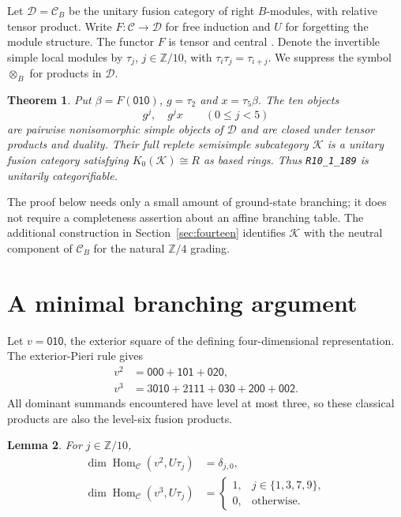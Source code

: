 \documentclass[11pt]{amsart}
\newtheorem{theorem}{Theorem}[section]
\newtheorem{lemma}[theorem]{Lemma}
\theoremstyle{remark}
\newcommand{\C}{\mathcal C}
\newcommand{\D}{\mathcal D}
\newcommand{\K}{\mathcal K}
\newcommand{\Hom}{\operatorname{Hom}}
\newcommand{\wt}[1]{\mathsf{#1}}
\begin{document}
Let $\D=\C_B$ be the unitary fusion category of right $B$-modules, with
relative tensor product. Write $F:\C\to\D$ for free induction and $U$ for
forgetting the module structure. The functor $F$ is tensor and central
\cite[\S\S3.3--3.4, equation~(17)]{DMNO}. Denote the invertible simple
local modules by $\tau_j$, $j\in\mathbb Z/10$, with
$\tau_i\tau_j=\tau_{i+j}$. We suppress the symbol $\otimes_B$ for
products in $\D$.

\begin{theorem}\label{thm:model}
Put $\beta=F(\wt{010})$, $g=\tau_2$ and $x=\tau_5\beta$. The ten objects
\[
  g^j,\quad g^jx\qquad (0\leq j<5)
\]
are pairwise nonisomorphic simple objects of $\D$ and are closed under
tensor products and duality. Their full replete semisimple subcategory
$\K$ is a unitary fusion category satisfying $K_0(\K)\cong R$ as based
rings. Thus \texttt{R10\_1\_189} is unitarily categorifiable.
\end{theorem}

The proof below needs only a small amount of ground-state branching; it
does not require a completeness assertion about an affine branching
table. The additional construction in Section~\ref{sec:fourteen}
identifies $\K$ with the neutral component of $\C_B$ for the natural
$\mathbb Z/4$ grading.

\section{A minimal branching argument}

Let $v=\wt{010}$, the exterior square of the defining four-dimensional
representation. The exterior-Pieri rule gives
\begin{align}
 v^2&=\wt{000}+\wt{101}+\wt{020},\label{eq:v2}\\
 v^3&=3\wt{010}+2\wt{111}+\wt{030}+\wt{200}+\wt{002}.
 \label{eq:v3}
\end{align}
All dominant summands encountered have level at most three, so these
classical products are also the level-six fusion products.

\begin{lemma}\label{lem:branch}
For $j\in\mathbb Z/10$,
\begin{align}
 \dim\Hom_{\C}(v^2,U\tau_j)&=\delta_{j,0},\label{eq:hom2}\\
 \dim\Hom_{\C}(v^3,U\tau_j)&=
 \begin{cases}1,&j\in\{1,3,7,9\},\\0,&\text{otherwise.}\end{cases}
 \label{eq:hom3}
\end{align}
\end{lemma}
\end{document}
